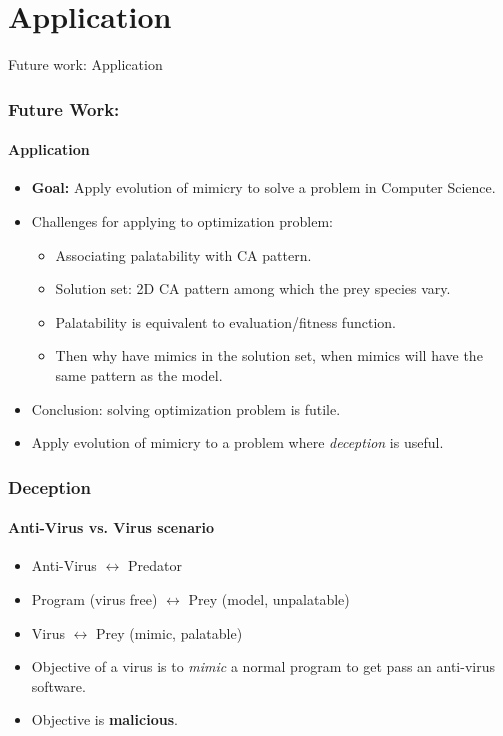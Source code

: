 \section{Application}

\frame
{
	\begin{center}
		\LARGE Future work: Application
	\end{center}
}

\frame
{
	\frametitle{Future Work:}
	\framesubtitle{Application}
	
	\begin{itemize}
		\item \textbf{Goal:} Apply evolution of mimicry to solve a problem in Computer Science.
		\item Challenges for applying to optimization problem:
			\begin{itemize}
				\item Associating palatability with CA pattern.
				\item Solution set: 2D CA pattern among which the prey species vary.
				\item Palatability is equivalent to evaluation/fitness function.
				\item Then why have mimics in the solution set, when mimics will have the same pattern as the model.
			\end{itemize}
		\item Conclusion: solving optimization problem is futile.
		\item Apply evolution of mimicry to a problem where \textit{deception} is useful.
	\end{itemize}
}

\frame
{
	\frametitle{Deception}
	\framesubtitle{Anti-Virus vs. Virus scenario}

	\begin{itemize}
		\item Anti-Virus \(\leftrightarrow\) Predator
		\item Program (virus free) \(\leftrightarrow\) Prey (model, unpalatable)
		\item Virus \(\leftrightarrow\) Prey (mimic, palatable)
	\end{itemize}
	
	\begin{itemize}
		\item Objective of a virus is to \textit{mimic} a normal program to get pass an anti-virus software.
		\item Objective is \textbf{malicious}.
	\end{itemize}
}
